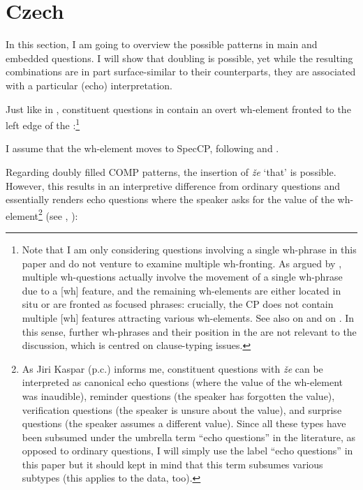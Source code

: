 \documentclass[output=paper,modfonts, hidelinks, newtxmath]{langscibook}
\begin{document}
\section{Czech}
In this section, I am going to overview the possible patterns in  main and embedded questions. I will show that doubling is possible, yet while the resulting combinations are in part surface-similar to their  counterparts, they are associated with a particular (echo) interpretation.

Just like in , constituent questions in  contain an overt wh-element fronted to the left edge of the :\footnote{Note that I am only considering questions involving a single wh-phrase in this paper and do not venture to examine multiple wh-fronting. As argued by \citet{Boskovic2012}, multiple wh-questions actually involve the movement of a single wh-phrase due to a [wh] feature, and the remaining wh-elements are either located in situ or are fronted as focused phrases: crucially, the CP does not contain multiple [wh] features attracting various wh-elements. See also \citet{gruetskrabalova2011} on  and \citet{mismas2016} on . In this sense, further wh-phrases and their position in the  are not relevant to the  discussion, which is centred on clause-typing issues.}

\ea
	\z
\z

\noindent I assume that the wh-element moves to SpecCP, following \citet{rudin1988} and \citet{kaspar2015}.

Regarding doubly filled COMP patterns, the insertion of \textit{že} `that' is possible. However, this results in an interpretive difference from ordinary questions and essentially renders echo questions where the speaker asks for the value of the wh-element\footnote{As Jiri Kaspar (p.c.) informs me, constituent questions with \textit{že} can be interpreted as canonical echo questions (where the value of the wh-element was inaudible), reminder questions (the speaker has forgotten the value), verification questions (the speaker is unsure about the value), and surprise questions (the speaker assumes a different value). Since all these types have been subsumed under the umbrella term ``echo questions'' in the literature, as opposed to ordinary questions, I will simply use the label ``echo questions'' in this paper but it should kept in mind that this term subsumes various subtypes (this applies to the  data, too).} (see \citealt{kaspar2015}, \citealt{gruetskrabalova2011}):
\end{document}

